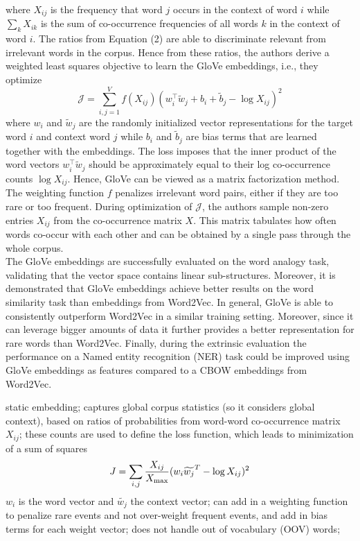 \documentclass[11pt, a4paper]{amsart}
\begin{document}
where $X_{ij}$ is the frequency that word $j$ occurs in the context of word $i$ while $\sum_{k} X_{ik}$ is the sum of co-occurrence frequencies of all words $k$ in the context of word $i$.
The ratios from Equation (2) are able to discriminate relevant from irrelevant words in the corpus. Hence from these ratios, the authors derive a weighted least squares objective to learn the GloVe embeddings, i.e., they optimize
\begin{equation}
	\mathcal{J} = \sum_{i,j = 1}^V f(X_{ij})(w_i^\top\widetilde{w}_j + b_i + \widetilde{b}_j - \log X_{ij})^2
\end{equation}
where $w_i$ and $\widetilde{w}_j$ are the randomly initialized vector representations for the target word $i$ and context word $j$ while $b_i$ and $\tilde{b}_j$ are bias terms that are learned together with the embeddings. The loss imposes that the inner product of the word vectors $w_i^\top\widetilde{w}_j$ should be approximately equal to their log co-occurrence counts $\log X_{ij}$. Hence, GloVe can be viewed as a matrix factorization method. The weighting function $f$ penalizes irrelevant word pairs, either if they are too rare or too frequent. During optimization of $\mathcal{J}$, the authors sample non-zero entries $X_{ij}$ from the co-occurrence matrix $X$. This matrix tabulates how often words co-occur with each other and can be obtained by a single pass through the whole corpus.\\

The GloVe embeddings are successfully evaluated on the word analogy task, validating that the vector space contains linear sub-structures. Moreover, it is demonstrated that GloVe embeddings achieve better results on the word similarity task than embeddings from Word2Vec. In general, GloVe is able to consistently outperform Word2Vec in a similar training setting. Moreover, since it can leverage bigger amounts of data it further provides a better representation for rare words than Word2Vec. Finally, during the extrinsic evaluation the performance on a Named entity recognition (NER) task could be improved using GloVe embeddings as features compared to a CBOW embeddings from Word2Vec.

{
\color{blue}
	
static embedding;
captures global corpus statistics (so it considers global context), based on ratios of probabilities from word-word co-occurrence matrix $X_{ij}$;
these counts are used to define the loss function, which leads to minimization of a sum of squares
\begin{equation*}
    J = \sum_{i, j} \frac{X_{ij}}{X_{\textup{max}}}
    (w_{i} \widetilde{w_{j}}^{T} - \log X_{ij})^{2}
\end{equation*}
$w_{i}$ is the word vector and $\widetilde{w_{j}}$ the context vector;
can add in a weighting function to penalize rare events and not over-weight frequent events, and add in bias terms for each weight vector;
does not handle out of vocabulary (OOV) words;
}
\end{document}
